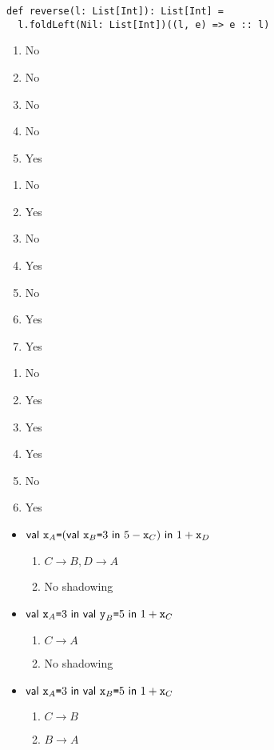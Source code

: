 \textbf{}
\vspace{-1em}
\begin{verbatim}
def reverse(l: List[Int]): List[Int] =
  l.foldLeft(Nil: List[Int])((l, e) => e :: l)
\end{verbatim}

\textbf{}
\begin{enumerate}
  \item No
  \item No
  \item No
  \item No
  \item Yes
\end{enumerate}

\textbf{}
\begin{enumerate}
  \item No
  \item Yes
  \item No
  \item Yes
  \item No
  \item Yes
  \item Yes
\end{enumerate}

\textbf{}
\begin{enumerate}
  \item No
  \item Yes
  \item Yes
  \item Yes
  \item No
  \item Yes
\end{enumerate}

\textbf{}

\begin{itemize}
  \item $\textsf{val}\ \texttt{x}_A\texttt{=}(\textsf{val}\ \texttt{x}_B\texttt{=}3\ \textsf{in}\ 5-\texttt{x}_C)\ \textsf{in}\ 1+\texttt{x}_D$
  \begin{enumerate}
    \item $C\rightarrow B,D\rightarrow A$
    \item No shadowing
  \end{enumerate}
  \item $\textsf{val}\ \texttt{x}_A\texttt{=}3\ \textsf{in}\ \textsf{val}\ \texttt{y}_B\texttt{=}5\ \textsf{in}\ 1+\texttt{x}_C$
  \begin{enumerate}
    \item $C\rightarrow A$
    \item No shadowing
  \end{enumerate}
  \item $\textsf{val}\ \texttt{x}_A\texttt{=}3\ \textsf{in}\ \textsf{val}\ \texttt{x}_B\texttt{=}5\ \textsf{in}\ 1+\texttt{x}_C$
  \begin{enumerate}
    \item $C\rightarrow B$
    \item $B\rightarrow A$
  \end{enumerate}
\end{itemize}

